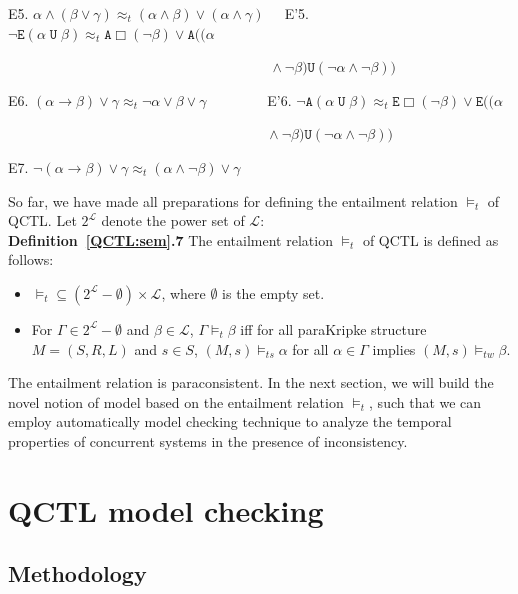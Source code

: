 \documentclass{entcs}
\begin{document}
E5. $\alpha\wedge (\beta\vee \gamma)\approx_t (\alpha\wedge
\beta)\vee (\alpha\wedge \gamma)\ \ \ \ \ $ E'5.
$\neg\texttt{E}(\alpha\; \texttt{U}\; \beta)\approx_t
\texttt{A}\Box(\neg \beta)\vee\texttt{A}((\alpha$

$\qquad\qquad\qquad\qquad\qquad\qquad\qquad\qquad\qquad\ \ \
\wedge \neg \beta )\texttt{U}(\neg \alpha\wedge\neg \beta))$

E6. $(\alpha\rightarrow \beta)\vee \gamma \approx_t \neg
\alpha\vee \beta\vee \gamma\qquad\qquad$ E'6. $\neg
\texttt{A}(\alpha\; \texttt{U}\;
\beta)\approx_t\texttt{E}\Box(\neg \beta)\vee\texttt{E}((\alpha$

$\qquad\qquad\qquad\qquad\qquad\qquad\qquad\qquad\qquad\ \
\wedge\neg \beta )\texttt{U}(\neg \alpha\wedge\neg \beta))$

E7. $\neg (\alpha\rightarrow \beta)\vee \gamma\approx_t
(\alpha\wedge\neg \beta)\vee \gamma$

So far, we have made all preparations for defining the entailment
relation $\models_t$ of QCTL. Let $2^{\mathcal{L}}$
denote the power set of $\mathcal{L}$:\\

\noindent\textbf{Definition~\ref{QCTL:sem}.7} The entailment
relation $\models_{t}$ of QCTL is defined as follows:
\begin{itemize}
\item $\models_t \subseteq (2^{\mathcal{L}}-\emptyset)\times
\mathcal{L}$, where $\emptyset$ is the empty set. \item For
$\Gamma\in 2^{\mathcal{L}}-\emptyset$ and $\beta\in \mathcal{L}$,
$\Gamma\models_t \beta$ iff for all paraKripke structure
$M=(S,R,L)$ and $s\in S$, $(M,s)\models_{ts}\alpha$ for all
$\alpha\in\Gamma$ implies $(M,s)\models_{tw}\beta$.
\end{itemize}

The entailment relation is paraconsistent. In the next section, we
will build the novel notion of model based on the entailment
relation $\models_t$, such that we can employ automatically model
checking technique to analyze the temporal properties of concurrent
systems in the presence of inconsistency.

\section{QCTL model checking}\label{mc}

\subsection{Methodology}\label{MC:metho}
\end{document}
